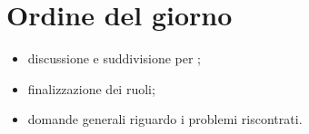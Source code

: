 \section{Ordine del giorno}
\begin{itemize}
\item discussione e suddivisione per \AdR;
\item finalizzazione dei ruoli;
\item domande generali riguardo i problemi riscontrati.
\end{itemize}